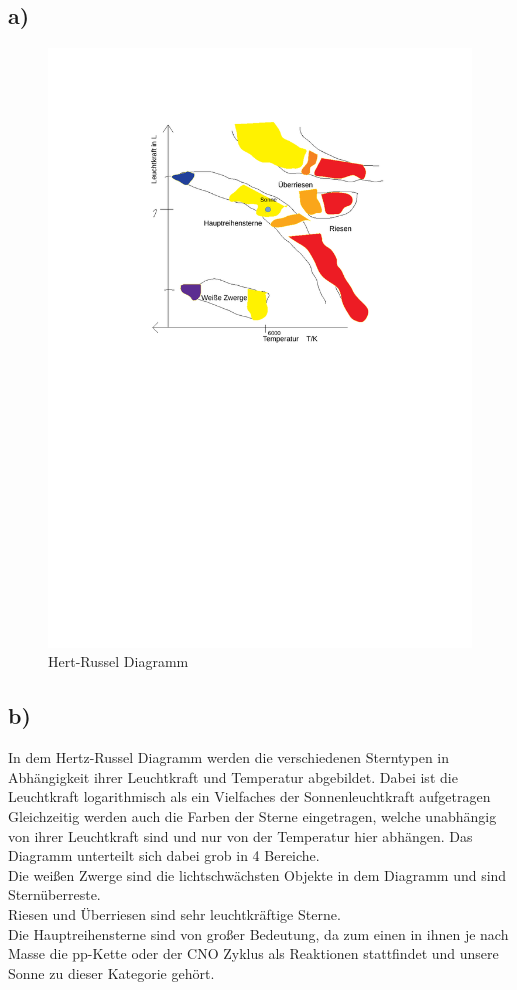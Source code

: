 \subsection{a)}
\begin{figure}[H]
    \centering
    \caption{Hert-Russel Diagramm}
    \includegraphics[width=\linewidth]{images/hertz_russel.pdf}
\end{figure}

\subsection{b)}
In dem Hertz-Russel Diagramm werden die verschiedenen Sterntypen
in Abhängigkeit ihrer Leuchtkraft und Temperatur abgebildet.
Dabei ist die Leuchtkraft logarithmisch als ein Vielfaches der
Sonnenleuchtkraft aufgetragen
Gleichzeitig werden auch die Farben der Sterne eingetragen, welche unabhängig
von ihrer Leuchtkraft sind und nur von der Temperatur hier abhängen.
Das Diagramm unterteilt sich dabei grob in 4 Bereiche.\\
Die weißen Zwerge sind die lichtschwächsten Objekte in dem Diagramm und sind Sternüberreste.\\
Riesen und Überriesen sind sehr leuchtkräftige Sterne.\\
Die Hauptreihensterne sind von großer Bedeutung, da zum einen in ihnen je nach Masse 
die pp-Kette oder der CNO Zyklus als Reaktionen stattfindet und unsere Sonne zu dieser Kategorie gehört.


